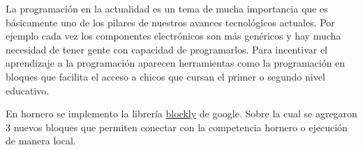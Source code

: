 \documentclass{articleteyet}
\begin{document}


La programación en la actualidad es un tema de mucha importancia que es básicamente uno de los pilares de nuestros avances tecnológicos actuales. Por ejemplo cada vez los componentes electrónicos son más genéricos y hay mucha necesidad de tener gente con capacidad de programarlos. Para incentivar el aprendizaje a la programación aparecen herramientas como la programación en bloques que facilita el acceso a chicos que cursan el primer o segundo nivel educativo.

En hornero se implemento la librería \href{https://developers.google.com/blockly}{blockly} de google.
Sobre la cual se agregaron 3 nuevos bloques que permiten conectar con la competencia hornero o ejecución de manera local.
  

    
\end{document}
